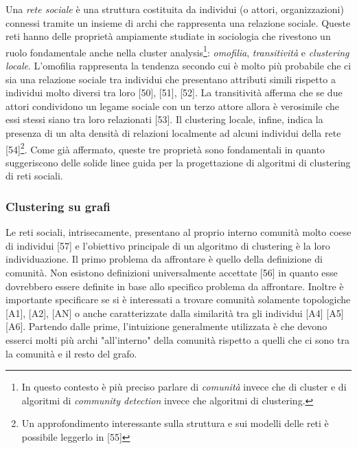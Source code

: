 Una \textit{rete sociale} \`e una struttura costituita da individui (o attori, organizzazioni) connessi tramite un insieme di archi che rappresenta una relazione sociale. Queste reti hanno delle propriet\`a ampiamente studiate in sociologia che rivestono un ruolo fondamentale anche nella cluster analysis\footnote{In questo contesto \`e pi\`u preciso parlare di \textit{comunit\`a} invece che di cluster e di algoritmi di \textit{community detection} invece che algoritmi di clustering.}: \textit{omofilia}, \textit{transitivit\`a} e \textit{clustering locale}. L'omofilia rappresenta la tendenza secondo cui \`e molto pi\`u probabile che ci sia una relazione sociale tra individui che presentano attributi simili rispetto a individui molto diversi tra loro [50], [51], [52]. La transitivit\`a afferma che se due attori condividono un legame sociale con un terzo attore allora \`e verosimile che essi stessi siano tra loro relazionati [53]. Il clustering locale, infine, indica la presenza di un alta densit\`a di relazioni localmente ad alcuni individui della rete [54]\footnote{Un approfondimento interessante sulla struttura e sui modelli delle reti \`e possibile leggerlo in [55]}. Come gi\`a affermato, queste tre propriet\`a sono fondamentali in quanto suggeriscono delle solide linee guida per la progettazione di algoritmi di clustering di reti sociali. 

\subsubsection{Clustering su grafi}
Le reti sociali, intrisecamente, presentano al proprio interno comunit\`a molto coese di individui [57] e l'obiettivo principale di un algoritmo di clustering \`e la loro individuazione. Il primo problema da affrontare \`e quello della definizione di comunit\`a. Non esistono definizioni universalmente accettate [56] in quanto esse dovrebbero essere definite in base allo specifico problema da affrontare. Inoltre \`e importante specificare se si \`e interessati a trovare comunit\`a solamente topologiche [A1], [A2], [AN] o anche caratterizzate dalla similarit\`a tra gli individui [A4] [A5] [A6]. Partendo dalle prime, l'intuizione generalmente utilizzata \`e che devono esserci molti pi\`u archi "all'interno" della comunit\`a rispetto a quelli che ci sono tra la comunit\`a e il resto del grafo. 




